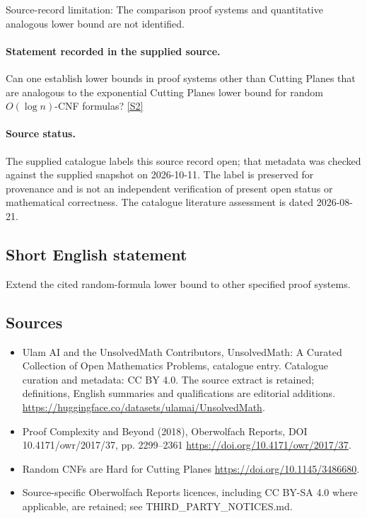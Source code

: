 \documentclass[11pt]{article}
\begin{document}
Source-record limitation: The comparison proof systems and quantitative analogous lower bound are not identified.
\paragraph{Statement recorded in the supplied source.}
Can one establish lower bounds in proof systems other than Cutting Planes that are analogous to the exponential Cutting Planes lower bound for random $O(\log n)$-CNF formulas? \href{https://doi.org/10.4171/owr/2017/37}{[S2]}
\paragraph{Source status.}
The supplied catalogue labels this source record open; that metadata was checked against the supplied snapshot on 2026-10-11. The label is preserved for provenance and is not an independent verification of present open status or mathematical correctness. The catalogue literature assessment is dated 2026-08-21.
\subsection{Short English statement}
Extend the cited random-formula lower bound to other specified proof systems.
\subsection{Sources}
\begin{itemize}
\item[S1] Ulam AI and the UnsolvedMath Contributors, UnsolvedMath: A Curated Collection of Open Mathematics Problems, catalogue entry. Catalogue curation and metadata: CC BY 4.0. The source extract is retained; definitions, English summaries and qualifications are editorial additions.
\url{https://huggingface.co/datasets/ulamai/UnsolvedMath}.
\item[S2] Proof Complexity and Beyond (2018), Oberwolfach Reports, DOI 10.4171/owr/2017/37, pp. 2299--2361
\url{https://doi.org/10.4171/owr/2017/37}.
\item[S3] Random CNFs are Hard for Cutting Planes
\url{https://doi.org/10.1145/3486680}.
\item Source-specific Oberwolfach Reports licences, including CC BY-SA 4.0 where applicable, are retained; see THIRD\_PARTY\_NOTICES.md.
\end{itemize}
\end{document}
